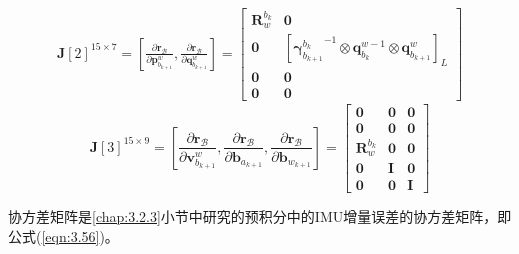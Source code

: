 \begin{equation}
\label{eqn:4.12}
\begin{aligned}
\mathbf{J}[2]^{15 \times 7} = \left[\frac{\partial \mathbf{r}_{\mathcal{B}}}{\partial \mathbf{p}_{b_{k+1}}^{w}}, \frac{\partial \mathbf{r}_{\mathcal{B}}}{\partial \mathbf{q}_{b_{k+1}}^{w}}\right] 
= \left[ \begin{array}{cc}
\mathbf{R}_{w}^{b_k} & {\bm{0}} \\ 
{\bm{0}} & \left[{\bm{\gamma}_{b_{k+1}}^{b_{k}}}^{-1} \otimes \mathbf{q}_{b_{k}}^{w-1} \otimes \mathbf{q}_{b_{k+1}}^{w}\right]_L \\ 
{\bm{0}} & {\bm{0}}  \\ 
{\bm{0}} & {\bm{0}} 
\end{array}\right]
\end{aligned}
\end{equation}
\begin{equation}
\label{eqn:4.13}
\mathbf{J}[3]^{15 \times 9}=\left[\frac{\partial \mathbf{r}_{\mathcal{B}}}{\partial \mathbf{v}_{b_{k+1}}^{w}}, \frac{\partial \mathbf{r}_{\mathcal{B}}}{\partial \mathbf{b}_{a_{k+1}}}, \frac{\partial \mathbf{r}_{\mathcal{B}}}{\partial \mathbf{b}_{w_{k+1}}}\right]
=\left[ \begin{array}{ccc}{\bm{0}} & {\bm{0}} & {\bm{0}} \\ {\bm{0}} & {\bm{0}} & {\bm{0}} \\ {\mathbf{R}_{w}^{b_{k}}} & {\bm{0}} & {\bm{0}} \\ {\bm{0}} & {\mathbf{I}} & {\bm{0}} \\ {\bm{0}} & {\bm{0}} & {\mathbf{I}}\end{array}\right]
\end{equation}

协方差矩阵是\ref{chap:3.2.3}小节中研究的预积分中的IMU增量误差的协方差矩阵，即公式(\ref{eqn:3.56})。
